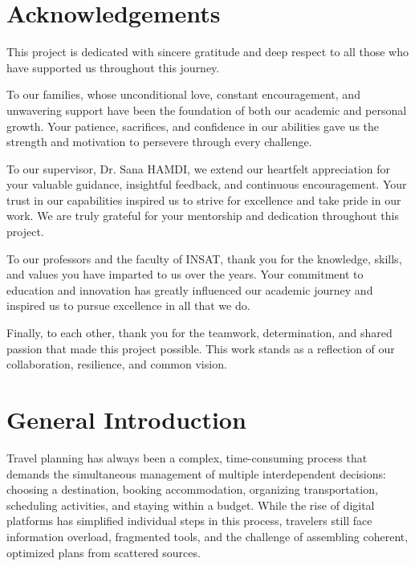 \documentclass[12pt,a4paper]{report}
\begin{document}
\chapter*{Acknowledgements}

This project is dedicated with sincere gratitude and deep respect to all those who have supported us throughout this journey.

To our families, whose unconditional love, constant encouragement, and unwavering support have been the foundation of both our academic and personal growth. Your patience, sacrifices, and confidence in our abilities gave us the strength and motivation to persevere through every challenge.

To our supervisor, Dr. Sana HAMDI, we extend our heartfelt appreciation for your valuable guidance, insightful feedback, and continuous encouragement. Your trust in our capabilities inspired us to strive for excellence and take pride in our work. We are truly grateful for your mentorship and dedication throughout this project.

To our professors and the faculty of INSAT, thank you for the knowledge, skills, and values you have imparted to us over the years. Your commitment to education and innovation has greatly influenced our academic journey and inspired us to pursue excellence in all that we do.

Finally, to each other, thank you for the teamwork, determination, and shared passion that made this project possible. This work stands as a reflection of our collaboration, resilience, and common vision.



\tableofcontents
\listoffigures
\listoftables

\chapter*{General Introduction}

Travel planning has always been a complex, time-consuming process that demands the simultaneous management
of multiple interdependent decisions: choosing a destination, booking accommodation, organizing
transportation, scheduling activities, and staying within a budget. While the rise of digital platforms
has simplified individual steps in this process, travelers still face information overload, fragmented
tools, and the challenge of assembling coherent, optimized plans from scattered sources.
\end{document}
